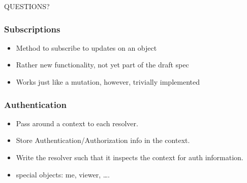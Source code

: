 \documentclass[lualatex]{beamer}
\begin{document}
\begin{frame}
  QUESTIONS?
\end{frame}

\begin{frame}
  \frametitle{Subscriptions}
  \begin{itemize}
  \item Method to subscribe to updates on an object
  \item Rather new functionality, not yet part of the draft spec
  \item Works just like a mutation, however, trivially implemented
  \end{itemize}
\end{frame}

\begin{frame}
  \frametitle{Authentication}
  \begin{itemize}
  \item Pass around a context to each resolver.
  \item Store Authentication/Authorization info in the context.
  \item Write the resolver such that it inspects the context for auth
    information.
  \item special objects: me, viewer, \ldots.
  \end{itemize}
\end{frame}
\end{document}
